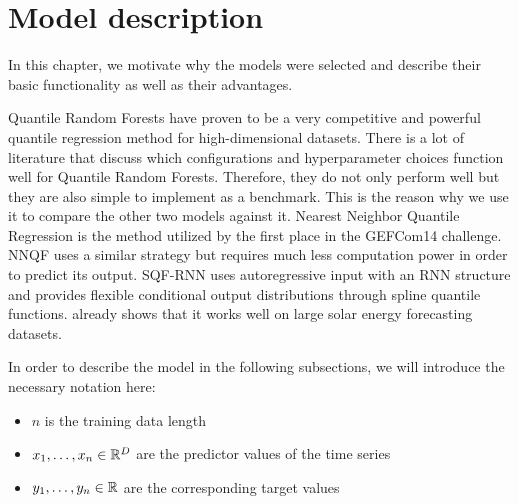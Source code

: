 \chapter{Model description}
\label{ch:model-description}

In this chapter, we motivate why the models were selected and 
describe their basic functionality as well as their advantages.

Quantile Random Forests have proven to be a very competitive 
and powerful quantile regression method for high-dimensional datasets. 
There is a lot of literature that discuss which configurations and hyperparameter 
choices function well for Quantile Random Forests. Therefore, they do not only perform 
well but they are also simple to implement as a benchmark.
This is the reason why we use it to compare the other two models 
against it.
Nearest Neighbor Quantile Regression is the method utilized by the first place 
in the GEFCom14 challenge. NNQF uses a similar strategy but requires much less 
computation power in order to predict its output. 
SQF-RNN uses autoregressive input with an RNN structure and provides flexible 
conditional output distributions through spline quantile functions. 
\Textcite{Gasthaus2019} already shows that it works well on large solar energy 
forecasting datasets.

In order to describe the model in the following subsections, we will introduce the necessary notation here:
\begin{itemize}
    \item \(n\) is the training data length
    \item \(x_1, \ldots, x_n \in \mathbb{R}^D\) are the predictor values of the time series
    \item \(y_1, \ldots, y_n \in \mathbb{R}\) are the corresponding target values
\end{itemize}





